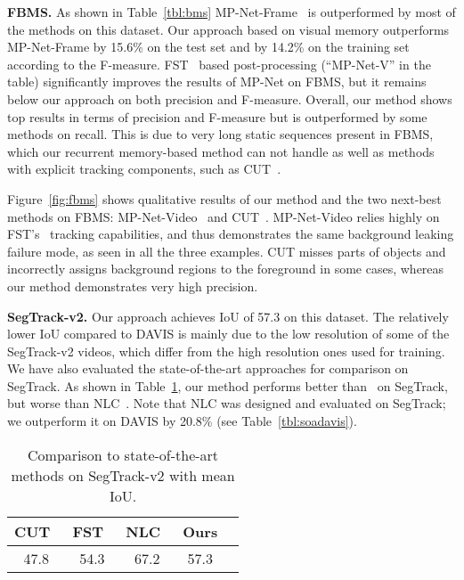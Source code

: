\documentclass[10pt,twocolumn,letterpaper]{article}
\begin{document}
\vspace{0.3cm}\noindent\textbf{FBMS.}
As shown in Table~\ref{tbl:bms} MP-Net-Frame~\cite{tokmakov2016learning} is
outperformed by most of the methods on this dataset. Our approach based on
visual memory outperforms MP-Net-Frame by 15.6\% on the test set and by 14.2\%
on the training set according to the F-measure. FST~\cite{papazoglou2013fast}
based post-processing (``MP-Net-V'' in the table) significantly improves the
results of MP-Net on FBMS, but it remains below our approach on both precision
and F-measure. Overall, our method shows top results in terms of precision and
F-measure but is outperformed by some methods on recall. This is due to very
long static sequences present in FBMS, which our recurrent memory-based method
can not handle as well as methods with explicit tracking components, such as
CUT~\cite{keuper2015motion}.

Figure~\ref{fig:fbms} shows qualitative results of our method and the two
next-best methods on FBMS: MP-Net-Video~\cite{tokmakov2016learning} and
CUT~\cite{keuper2015motion}. MP-Net-Video relies highly on
FST's~\cite{papazoglou2013fast} tracking capabilities, and thus demonstrates
the same background leaking failure mode, as seen in all the three examples.
CUT misses parts of objects and incorrectly assigns background regions to the
foreground in some cases, whereas our method demonstrates very high precision.

\vspace{0.3cm}\noindent\textbf{SegTrack-v2.}
Our approach achieves IoU of 57.3 on this dataset. The relatively lower IoU
compared to DAVIS is mainly due to the low resolution of some of the
SegTrack-v2 videos, which differ from the high resolution ones used for
training. We have also evaluated the state-of-the-art approaches for comparison
on SegTrack. As shown in Table~\ref{tbl:strck}, our method performs better
than~\cite{keuper2015motion,papazoglou2013fast} on SegTrack, but worse than
NLC~\cite{Faktor14}. Note that NLC was designed and evaluated on SegTrack; we
outperform it on DAVIS by 20.8\% (see Table~\ref{tbl:soadavis}).
\begin{table}[t]
\begin{center}
\begin{tabular}{c c c c c}
\hline
CUT~\cite{keuper2015motion} & FST~\cite{papazoglou2013fast} &  NLC~\cite{Faktor14}  & Ours \\
\hline
47.8 & 54.3  & 67.2 & 57.3  \\
\hline
\end{tabular}
\end{center}
\vspace{0.1cm}
\caption{Comparison to state-of-the-art methods on SegTrack-v2 with mean IoU.}
\label{tbl:strck}
\end{table}
\end{document}
